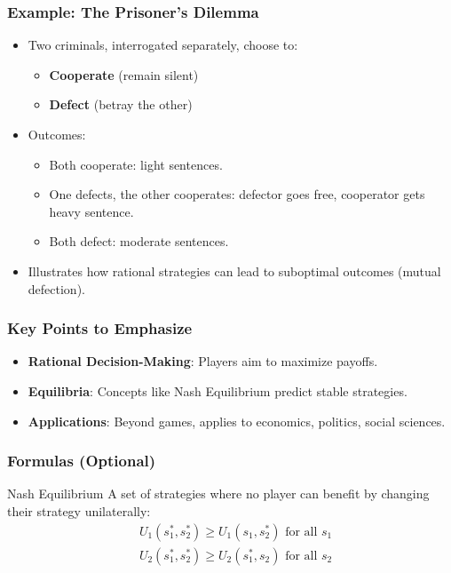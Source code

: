 \documentclass[aspectratio=169]{beamer}
\begin{document}
\begin{frame}[fragile]
    \frametitle{Example: The Prisoner’s Dilemma}
    \begin{itemize}
        \item Two criminals, interrogated separately, choose to:
            \begin{itemize}
                \item \textbf{Cooperate} (remain silent)
                \item \textbf{Defect} (betray the other)
            \end{itemize}
        \item Outcomes:
            \begin{itemize}
                \item Both cooperate: light sentences.
                \item One defects, the other cooperates: defector goes free, cooperator gets heavy sentence.
                \item Both defect: moderate sentences.
            \end{itemize}
        \item Illustrates how rational strategies can lead to suboptimal outcomes (mutual defection).
    \end{itemize}
\end{frame}

\begin{frame}[fragile]
    \frametitle{Key Points to Emphasize}
    \begin{itemize}
        \item \textbf{Rational Decision-Making}: Players aim to maximize payoffs.
        \item \textbf{Equilibria}: Concepts like Nash Equilibrium predict stable strategies.
        \item \textbf{Applications}: Beyond games, applies to economics, politics, social sciences.
    \end{itemize}
\end{frame}

\begin{frame}[fragile]
    \frametitle{Formulas (Optional)}
    \begin{block}{Nash Equilibrium}
        A set of strategies where no player can benefit by changing their strategy unilaterally:
        \begin{equation}
            \begin{aligned}
            & U_1(s_1^\ast, s_2^\ast) \geq U_1(s_1, s_2^\ast) \text{ for all } s_1 \\
            & U_2(s_1^\ast, s_2^\ast) \geq U_2(s_1^\ast, s_2) \text{ for all } s_2
            \end{aligned}
        \end{equation}
    \end{block}
\end{frame}
\end{document}
